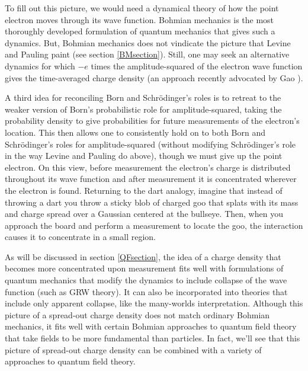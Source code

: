 \documentclass[onecolumn,secnumarabic,amsmath,amssymb,balancelastpage,nofootinbib]{article}
\begin{document}
To fill out this picture, we would need a dynamical theory of how the point electron moves through its wave function.  Bohmian mechanics is the most thoroughly developed formulation of quantum mechanics that gives such a dynamics.  But, Bohmian mechanics does not vindicate the picture that Levine and Pauling paint (see section \ref{BMsection}).  Still, one may seek an alternative dynamics for which $-e$ times the amplitude-squared of the electron wave function gives the time-averaged charge density (an approach recently advocated by Gao \cite{gao2014, gao2017, gao2018, gao2020}).

A third idea for reconciling Born and Schr\"{o}dinger's roles is to retreat to the weaker version of Born's probabilistic role for amplitude-squared, taking the probability density to give probabilities for future measurements of the electron's location.  This then allows one to consistently hold on to both Born and Schr\"{o}dinger's roles for amplitude-squared (without modifying Schr\"{o}dinger's role in the way Levine and Pauling do above), though we must give up the point electron.  On this view, before measurement the electron's charge is distributed throughout its wave function and after measurement it is concentrated wherever the electron is found.  Returning to the dart analogy, imagine that instead of throwing a dart you throw a sticky blob of charged goo that splats with its mass and charge spread over a Gaussian centered at the bullseye.  Then, when you approach the board and perform a measurement to locate the goo, the interaction causes it to concentrate in a small region.

As will be discussed in section \ref{QFsection}, the idea of a charge density that becomes more concentrated upon measurement fits well with formulations of quantum mechanics that modify the dynamics to include collapse of the wave function (such as GRW theory).  It can also be incorporated into theories that include only apparent collapse, like the many-worlds interpretation.  Although this picture of a spread-out charge density does not match ordinary Bohmian mechanics, it fits well with certain Bohmian approaches to quantum field theory that take fields to be more fundamental than particles.  In fact, we'll see that this picture of spread-out charge density can be combined with a variety of approaches to quantum field theory.
\end{document}
